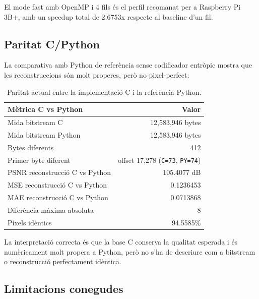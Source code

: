 \documentclass[11pt,a4paper]{article}
\begin{document}
El mode fast amb OpenMP i 4 fils és el perfil recomanat per a Raspberry Pi 3B+, amb un speedup total de 2.6753x respecte al baseline d'un fil.

\subsection{Paritat C/Python}

La comparativa amb Python de referència sense codificador entròpic mostra que les reconstruccions són molt properes, però no pixel-perfect:

\begin{table}[H]
\centering
\begin{tabular}{lr}
\toprule
\textbf{Mètrica C vs Python} & \textbf{Valor} \\
\midrule
Mida bitstream C & 12,583,946 bytes \\
Mida bitstream Python & 12,583,946 bytes \\
Bytes diferents & 412 \\
Primer byte diferent & offset 17,278 (\texttt{C=73}, \texttt{PY=74}) \\
PSNR reconstrucció C vs Python & 105.4077 dB \\
MSE reconstrucció C vs Python & 0.1236453 \\
MAE reconstrucció C vs Python & 0.0713868 \\
Diferència màxima absoluta & 8 \\
Píxels idèntics & 94.5585\% \\
\bottomrule
\end{tabular}
\caption{Paritat actual entre la implementació C i la referència Python.}
\end{table}

La interpretació correcta és que la base C conserva la qualitat esperada i és numèricament molt propera a Python, però no s'ha de descriure com a bitstream o reconstrucció perfectament idèntica.

\subsection{Limitacions conegudes}
\end{document}
